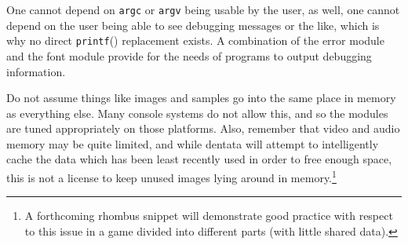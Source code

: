 One cannot depend on {\tt argc} or {\tt argv} being usable by the
user, as well, one cannot depend on the user being able to see
debugging messages or the like, which is why no direct {\tt printf}()
replacement exists. A combination of the error module and the font
module provide for the needs of programs to output debugging
information.

Do not assume things like images and samples go into the same place
in memory as everything else. Many console systems do not allow this,
and so the modules are tuned appropriately on those platforms.
Also, remember that video and audio memory may be quite limited,
and while dentata will attempt to intelligently cache the data which
has been least recently used in order to free enough space, this
is not a license to keep unused images lying around in memory.\footnote{A
forthcoming rhombus snippet will demonstrate good practice with
respect to this issue in a game divided into different parts (with
little shared data).}
